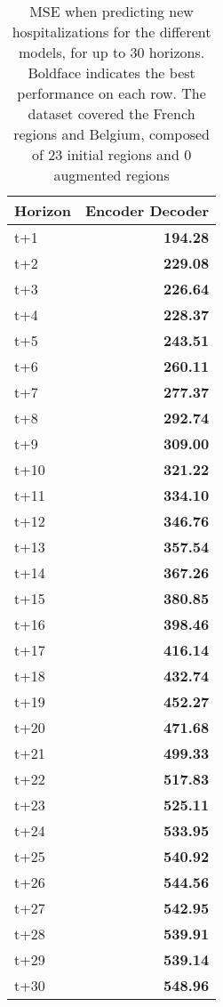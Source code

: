 \begin{table}[H]
\centering
\caption{MSE when predicting new hospitalizations for the different models, for up to 30 horizons. Boldface indicates the best performance on each row. The dataset covered the French regions and Belgium, composed of 23 initial regions and 0 augmented regions }
\label{tab:MSE_comparison}
\begin{tabular}{lr}
\toprule
Horizon &  Encoder Decoder \\
\midrule
t+1  & \textbf{194.28}  \\
t+2  & \textbf{229.08}  \\
t+3  & \textbf{226.64}  \\
t+4  & \textbf{228.37}  \\
t+5  & \textbf{243.51}  \\
t+6  & \textbf{260.11}  \\
t+7  & \textbf{277.37}  \\
t+8  & \textbf{292.74}  \\
t+9  & \textbf{309.00}  \\
t+10  & \textbf{321.22}  \\
t+11  & \textbf{334.10}  \\
t+12  & \textbf{346.76}  \\
t+13  & \textbf{357.54}  \\
t+14  & \textbf{367.26}  \\
t+15  & \textbf{380.85}  \\
t+16  & \textbf{398.46}  \\
t+17  & \textbf{416.14}  \\
t+18  & \textbf{432.74}  \\
t+19  & \textbf{452.27}  \\
t+20  & \textbf{471.68}  \\
t+21  & \textbf{499.33}  \\
t+22  & \textbf{517.83}  \\
t+23  & \textbf{525.11}  \\
t+24  & \textbf{533.95}  \\
t+25  & \textbf{540.92}  \\
t+26  & \textbf{544.56}  \\
t+27  & \textbf{542.95}  \\
t+28  & \textbf{539.91}  \\
t+29  & \textbf{539.14}  \\
t+30  & \textbf{548.96}  \\

\bottomrule
\end{tabular}
\end{table}
